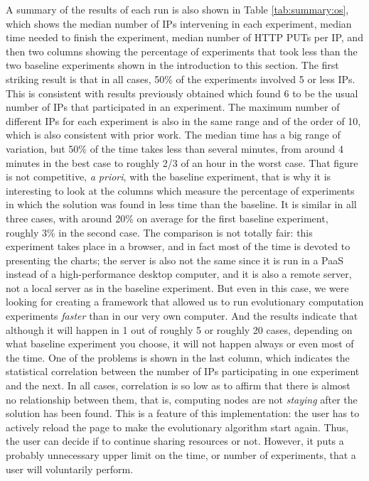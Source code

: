 \documentclass[journal,onecolumn]{IEEEtran}
\begin{document}
A summary of the results of each run is also shown in Table
\ref{tab:summary:os}, which shows the median number of IPs
intervening in each experiment,  median time needed
to finish the experiment, median number of HTTP PUTs per IP, and
then two columns showing the percentage of experiments that took less
than the two baseline experiments shown in the introduction to this
section. The first striking result is that in all cases, 50\% of the
experiments involved 5 or less IPs. This is consistent with results
previously obtained \cite{DBLP:conf/gecco/GuervosG15} which found 6 to be
the usual number of IPs that participated in an experiment. The
maximum number of different IPs for each experiment is also in the
same range and of the order of 10, which is also consistent with
prior work. The median time has a big range of variation, but 50\% of
the time takes less than several minutes, from around 4 minutes in the
best case to roughly 2/3 of an hour in the worst case. That figure is
not competitive, {\em a priori}, with the baseline experiment, that is
why it is interesting to look at the columns which measure
the percentage of experiments in which the solution was found in less
time than the baseline. It is similar in all three cases, with around
20\% on average for the first baseline experiment, roughly 3\% in the
second case. The comparison is not totally fair: this experiment takes
place in a browser, and in fact most of the time is devoted to
presenting the charts; the server is also not the same since it is run in a
PaaS instead of a high-performance desktop computer, and it is also a
remote server, not a local server as in the baseline experiment. But
even in this case, we were looking for creating a framework that
allowed us to run evolutionary computation experiments {\em faster} than
in our very own computer. And the results indicate that although it will
happen in 1 out of roughly 5 or roughly 20 cases, depending on what baseline
experiment you choose, it will not happen always or even most of
the time. One of the problems is shown in the last column, which
indicates the statistical correlation between the number of IPs
participating in one experiment and the next. In all cases,
correlation is so low as to affirm that there is almost no
relationship between them, that is, computing nodes are not {\em
  staying} after the solution has been found. This is a feature of
this implementation: the user has to actively reload the page to make
the evolutionary algorithm start again. Thus, the user can decide if to 
continue sharing resources or not. %
However, it puts a probably            %
unnecessary upper limit on the time, or number of experiments, that a user
will voluntarily perform.
\end{document}

